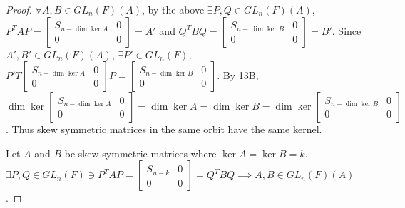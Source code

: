 \documentclass{article}
\begin{document}
\begin{proof}
    
    $\forall A, B \in GL_n(F)(A)$, by the above $\exists P, Q \in GL_n(F)(A)$, $P^TAP = \begin{bmatrix}
        S_{n - \dim \ker A} & 0 \\
        0 & 0
    \end{bmatrix} = A'$ and $Q^TBQ = \begin{bmatrix}
        S_{n - \dim \ker B} & 0 \\
        0 & 0
    \end{bmatrix} = B'$. Since $A', B' \in GL_n(F)(A)$, $\exists P' \in GL_n(F)$, $P'T\begin{bmatrix}
        S_{n - \dim \ker A} & 0 \\
        0 & 0
    \end{bmatrix}P = \begin{bmatrix}
        S_{n - \dim \ker B} & 0 \\
        0 & 0
    \end{bmatrix}$. By 13B, $\dim \ker \begin{bmatrix}
        S_{n - \dim \ker A} & 0 \\
        0 & 0
    \end{bmatrix} = \dim \ker A = \dim \ker B = \dim \ker \begin{bmatrix}
        S_{n - \dim \ker B} & 0 \\
        0 & 0
    \end{bmatrix}$. Thus skew symmetric matrices in the same orbit have the same kernel. 
    
    Let $A$ and $B$ be skew symmetric matrices where $\ker A = \ker B = k$. $\exists P, Q \in GL_n(F) \ni P^TAP = \begin{bmatrix}
        S_{n - k} & 0 \\
        0 & 0
    \end{bmatrix} = Q^TBQ \implies A, B \in GL_n(F)(A)$.
\end{proof}
\end{document}
